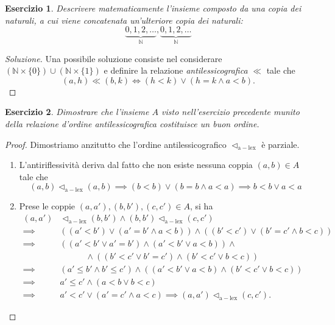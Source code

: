 \documentclass[fontsize = 11 pt, paper=A4, oneside, index=totoc, hyperref]{book}
\theoremstyle{definition}
\theoremstyle{plain}
\newtheorem{exe}{Esercizio}[section]
\newcommand{\N}{\mathbb{N}}
\newcommand{\ordine}[1]{\vartriangleleft_{\mathrm{#1}}}
\begin{document}
\begin{exe}
  Descrivere matematicamente l'insieme composto da una copia dei naturali, a cui viene concatenata un'ulteriore copia dei naturali:
  \[
  \underbrace{0,1,2,\dots}_{\N},\underbrace{0,1,2,\dots}_{\N}
  \]
\end{exe}
\begin{proof}[Soluzione]
  Una possibile soluzione consiste nel considerare \((\N \times \lbrace 0 \rbrace) \cup (\N \times \lbrace 1 \rbrace)\) e definire la relazione \emph{antilessicografica} \(\ll\) tale che
  \begin{equation}
    (a,h) \ll (b,k) \iff (h < k) \lor (h = k \land a < b).
  \end{equation}
\end{proof}
\begin{exe}
  Dimostrare che l'insieme \(A\) visto nell'esercizio precedente munito della relazione d'ordine antilessicografica costituisce un buon ordine.
\end{exe}
\begin{proof}
  Dimostriamo anzitutto che l'ordine antilessicografico \(\ordine{a-lex}\) è parziale.
  \begin{enumerate}
    \item L'antiriflessività deriva dal fatto che non esiste nessuna coppia \((a,b) \in A\) tale che
    \[
    (a,b) \ordine{a-lex} (a, b) \implies (b < b) \lor (b = b \land a < a) \implies b < b \lor a < a
    \]
    \item Prese le coppie \((a,a'), (b,b'), (c,c') \in A\), si ha
    \begin{align*}
    (a,a') &\ordine{a-lex} (b,b') \land (b,b') \ordine{a-lex} (c,c') \\
    \implies & ((a' < b') \lor (a' = b' \land a < b)) \land ((b' < c') \lor (b' = c' \land b < c)) \\
    \implies & ((a' < b' \lor a' = b') \land (a' < b' \lor a < b)) \land\\
    & \quad\quad\quad \land ((b' < c' \lor b' = c') \land (b' < c' \lor b < c)) \\
    \implies & (a' \le b' \land b' \le c') \land ((a' < b' \lor a < b) \land (b' < c' \lor b < c)) \\
    \implies & a' \le c' \land (a < b \lor b < c) \\
    \implies & a' < c' \lor (a' = c' \land a < c) \implies (a,a') \ordine{a-lex} (c,c').
    \end{align*}
  \end{enumerate}
\end{proof}
\end{document}
